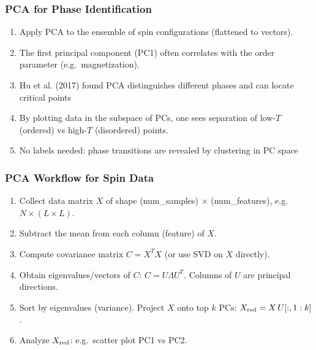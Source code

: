 \documentclass{beamer}
\begin{document}
\begin{frame}
\frametitle{PCA for Phase Identification}

\begin{enumerate}
\item Apply PCA to the ensemble of spin configurations (flattened to vectors).

\item The first principal component (PC1) often correlates with the order parameter (e.g.\ magnetization).

\item Hu et al. (2017) found PCA distinguishes different phases and can locate critical points 

\item By plotting data in the subspace of PCs, one sees separation of low-$T$ (ordered) vs high-$T$ (disordered) points.

\item No labels needed: phase transitions are revealed by clustering in PC space 
\end{enumerate}

\noindent
\end{frame}

\begin{frame}
\frametitle{PCA Workflow for Spin Data}

\begin{enumerate}
\item Collect data matrix $X$ of shape (num\_samples) $\times$ (num\_features), e.g.~$N\times (L\times L)$.

\item Subtract the mean from each column (feature) of $X$.

\item Compute covariance matrix $C = X^T X$ (or use SVD on $X$ directly).

\item Obtain eigenvalues/vectors of $C$: $C = U \Lambda U^T$. Columns of $U$ are principal directions.

\item Sort by eigenvalues (variance). Project $X$ onto top $k$ PCs: $X_{\rm red} = X\,U[:,1:k]$.

\item Analyze $X_{\rm red}$: e.g.~scatter plot PC1 vs PC2.
\end{enumerate}

\noindent
\end{frame}
\end{document}
